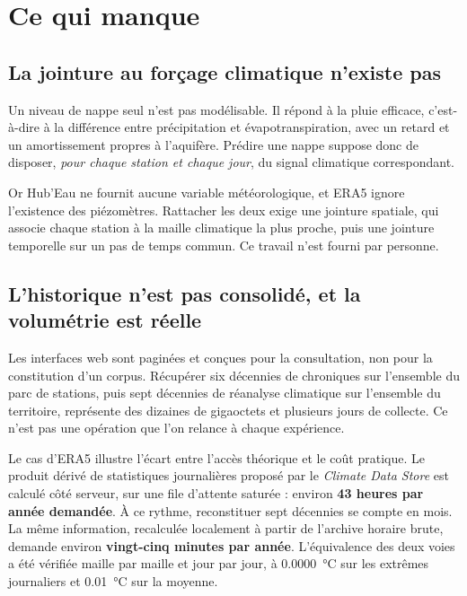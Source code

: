 \section{Ce qui manque}

\subsection{La jointure au forçage climatique n'existe pas}

Un niveau de nappe seul n'est pas modélisable. Il répond à la pluie efficace, c'est-à-dire à la
différence entre précipitation et évapotranspiration, avec un retard et un amortissement
propres à l'aquifère. Prédire une nappe suppose donc de disposer, \emph{pour chaque station et
chaque jour}, du signal climatique correspondant.

Or Hub'Eau ne fournit aucune variable météorologique, et ERA5 ignore l'existence des
piézomètres. Rattacher les deux exige une jointure spatiale, qui associe chaque station à la
maille climatique la plus proche, puis une jointure temporelle sur un
pas de temps commun. Ce travail n'est fourni par personne.

\subsection{L'historique n'est pas consolidé, et la volumétrie est réelle}

Les interfaces web sont paginées et conçues pour la consultation, non pour la constitution
d'un corpus. Récupérer six décennies de chroniques sur l'ensemble du parc de stations, puis
sept décennies de réanalyse climatique sur l'ensemble du territoire, représente des dizaines de
gigaoctets et plusieurs jours de collecte. Ce n'est pas une opération que l'on relance à chaque
expérience.

Le cas d'ERA5 illustre l'écart entre l'accès théorique et le coût pratique. Le produit dérivé
de statistiques journalières proposé par le \emph{Climate Data Store} est calculé côté serveur,
sur une file d'attente saturée : environ \textbf{43 heures par année demandée}. À ce rythme,
reconstituer sept décennies se compte en mois. La même information, recalculée localement à
partir de l'archive horaire brute, demande environ \textbf{vingt-cinq minutes par année}.
L'équivalence des deux voies a été vérifiée maille par maille et jour par jour, à
\SI[group-digits=integer]{0.0000}{\celsius} sur les extrêmes journaliers et \SI{0.01}{\celsius} sur la moyenne.

